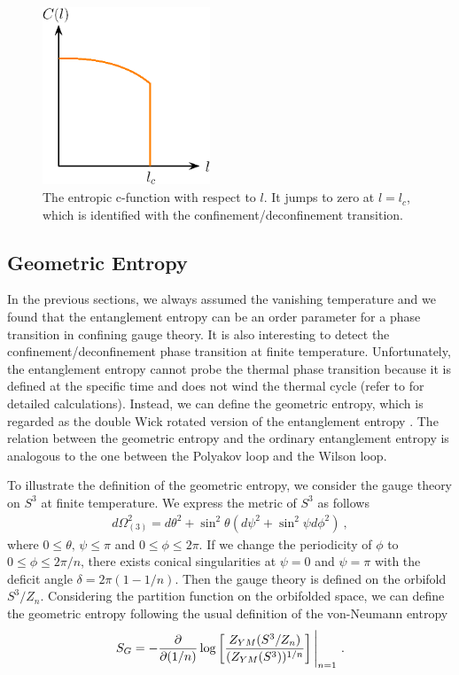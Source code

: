\documentclass[12pt]{article}
\def\d#1{\,{\rm d}#1}
\def\d{{\delta}}
\def\t{{\theta}}
\def\frac#1#2{{#1\over #2}}
\def\p{\partial}
\def\f {\frac}
\def\d{{\delta}}
\def\t{{\theta}}
\def\frac#1#2{{#1\over #2}}
\def\p{\partial}
\begin{document}
\begin{figure}
\begin{center}
\includegraphics[width=5cm,clip]{entropic_c_func.eps}
\end{center}

\caption{\label{fig:entropic_c}
The entropic c-function with respect to $l$.
It jumps to zero at $l=l_c$, which is identified with
the confinement/deconfinement transition.}
\end{figure}


\subsection{Geometric Entropy}\hspace{5mm}
In the previous sections, we always assumed the vanishing temperature
and we found that the entanglement entropy can be an order parameter
for a phase transition in confining gauge theory.  It is also interesting to
detect the confinement/deconfinement phase transition at finite temperature. Unfortunately,
the entanglement entropy cannot probe the thermal phase transition because it is
defined at the specific time and does not wind the thermal cycle
(refer to \cite{Faraggi:2007fu} for detailed calculations).
Instead, we can define the geometric entropy, which is regarded as the double Wick rotated
version of the entanglement entropy \cite{Fujita:2008zv}.
The relation between the geometric entropy and the ordinary entanglement entropy is
analogous to the one between the Polyakov loop and the Wilson loop.

To illustrate the definition of the geometric entropy, we consider the gauge theory
on $S^3$ at finite temperature. We express the metric of $S^3$ as follows
\begin{align}
    d\Omega_{(3)}^2 = d\t^2 + \sin^2\t (d\psi^2 + \sin^2\psi d\phi^2) \ ,
\end{align}
where $0 \le \t,\, \psi \le \pi$ and $0 \le \phi \le 2\pi$.
If we change the periodicity of $\phi$ to $0\le \phi \le 2\pi/n$,
there exists
conical singularities at $\psi= 0$ and $\psi =\pi$ with the deficit angle $\d = 2\pi (1-1/n)$.
Then the gauge theory is defined on the orbifold $S^3/Z_n$.
Considering the partition function on the orbifolded space, we can define the geometric
entropy following the usual definition of the
von-Neumann entropy \cite{Fujita:2008zv}
\begin{align}
    S_G = -\f{\p}{\p (1/n)}\log \left[ \f{Z_{YM}(S^3/Z_n)}{(Z_{YM}(S^3))^{1/n}} \right] \Bigg|_{n=1} \ .
\end{align}
\end{document}
